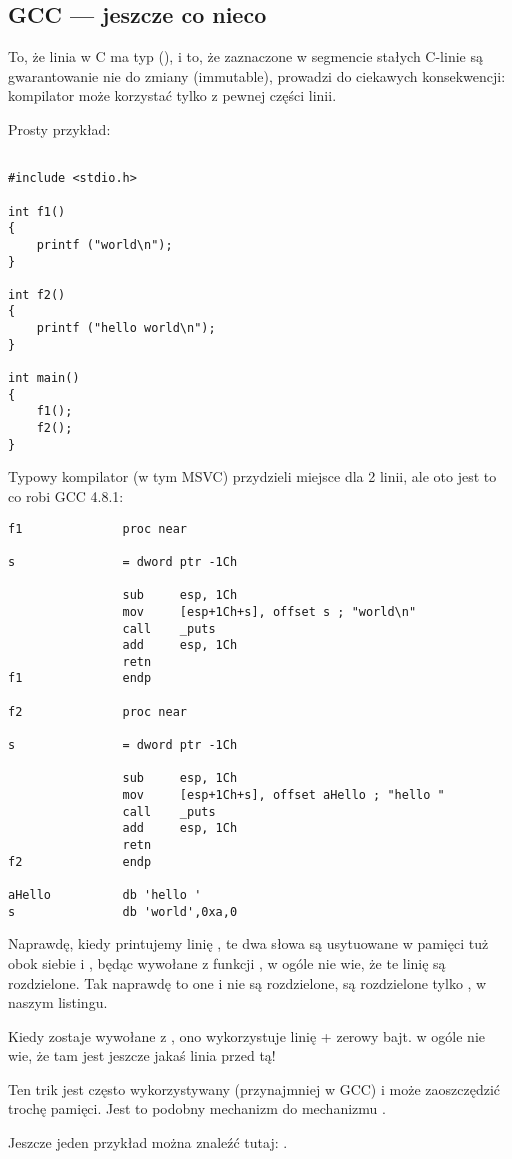 \subsection{GCC --- jeszcze co nieco}
\label{use_parts_of_C_strings}

To, że  linia w C ma typ  (), 
i to, że zaznaczone w segmencie stałych C-linie są gwarantowanie nie do zmiany (immutable), 
prowadzi do ciekawych konsekwencji: kompilator może korzystać tylko z pewnej części linii.

Prosty przykład:

\begin{lstlisting}[style=customc]

#include <stdio.h>

int f1()
{
	printf ("world\n");
}

int f2()
{
	printf ("hello world\n");
}

int main()
{
	f1();
	f2();
}
\end{lstlisting}

Typowy kompilator \CCpp (w tym MSVC) przydzieli miejsce dla 2 linii, ale oto jest to co robi GCC 4.8.1:

\begin{lstlisting}[caption=GCC 4.8.1 + listing w IDA,style=customasmx86]
f1              proc near

s               = dword ptr -1Ch

                sub     esp, 1Ch
                mov     [esp+1Ch+s], offset s ; "world\n"
                call    _puts
                add     esp, 1Ch
                retn
f1              endp

f2              proc near

s               = dword ptr -1Ch

                sub     esp, 1Ch
                mov     [esp+1Ch+s], offset aHello ; "hello "
                call    _puts
                add     esp, 1Ch
                retn
f2              endp

aHello          db 'hello '
s               db 'world',0xa,0
\end{lstlisting}

Naprawdę, kiedy printujemy linię , 
te dwa słowa są usytuowane w pamięci tuż obok siebie i \puts, będąc wywołane z funkcji , w ogóle nie wie,
że te linię są rozdzielone. Tak naprawdę to one i nie są rozdzielone, są rozdzielone 
tylko , w naszym listingu.

Kiedy \puts zostaje wywołane z , ono wykorzystuje linię  + zerowy bajt. \puts w ogóle nie wie, że tam jest jeszcze jakaś linia przed tą!

Ten trik jest często wykorzystywany (przynajmniej w GCC) i może zaoszczędzić trochę pamięci.
Jest to podobny mechanizm do mechanizmu .

Jeszcze jeden przykład można znaleźć tutaj: .


